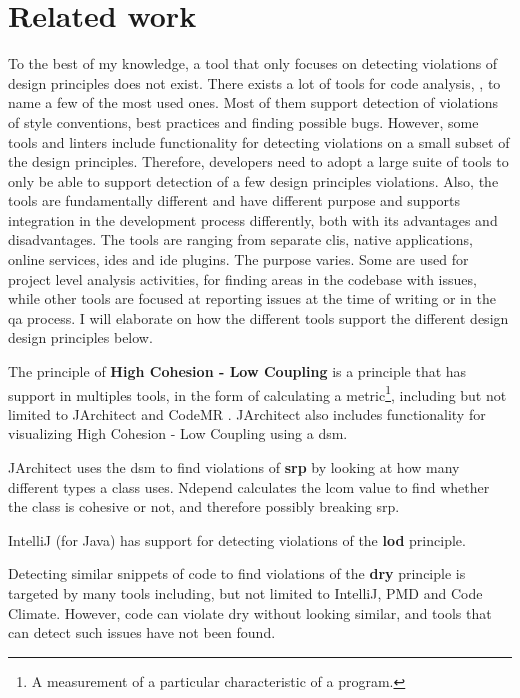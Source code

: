\documentclass{report}
\begin{document}
\chapter{Related work}
\label{relatedwork}

To the best of my knowledge, a tool that only focuses on detecting violations of design principles does not exist. There exists a lot of tools for code analysis, \cite{}, \cite{} to name a few of the most used ones. Most of them support detection of violations of style conventions, best practices and finding possible bugs. However, some tools and linters include functionality for detecting violations on a small subset of the design principles. Therefore, developers need to adopt a large suite of tools to only be able to support detection of a few design principles violations. Also, the tools are fundamentally different and have different purpose and supports integration in the development process differently, both with its advantages and disadvantages. The tools are ranging from separate \gls{cli}s, native applications, online services, \gls{ide}s and \gls{ide} plugins. The purpose varies. Some are used for project level analysis activities, for finding areas in the codebase with issues, while other tools are focused at reporting issues at the time of writing or in the \gls{qa} process. I will elaborate on how the different tools support the different design design principles below.

The principle of \textbf{High Cohesion - Low Coupling} is a principle that has support in multiples tools, in the form of calculating a metric\footnote{A measurement of a particular characteristic of a program.}, including but not limited to JArchitect \cite{jarchitect} and CodeMR \cite{codemr}. JArchitect \cite{jarchitect} also includes functionality for visualizing  High Cohesion - Low Coupling using a \gls{dsm}. 

JArchitect uses the \gls{dsm} to find violations of \textbf{\gls{srp}} by looking at how many different types a class uses. Ndepend \cite{ndepend} calculates the \gls{lcom} value to find whether the class is cohesive or not, and therefore possibly breaking \gls{srp}. 

IntelliJ \cite{IntelliJ} (for Java) has support for detecting violations of the \textbf{\gls{lod}} principle.

Detecting similar snippets of code to find violations of the \textbf{\gls{dry}} principle is targeted by many tools including, but not limited to IntelliJ, PMD and Code Climate. However, code can violate \gls{dry} without looking similar, and tools that can detect such issues have not been found.  
\end{document}
